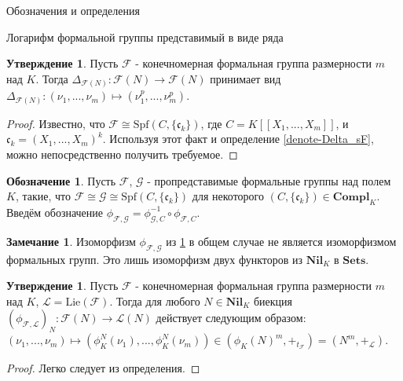 \documentclass[a4paper,14pt]{extarticle}
\theoremstyle{definition}
\newtheorem{denotation}[definition]{Обозначение}
\newtheorem{claim}[theorem]{Утверждение}
\newtheorem{remark}{Замечание}[section]
\newcommand{\Sets}{\mathbf{Sets}}
\newcommand{\Compl}[1]{\mathbf{Compl}_{#1}}
\newcommand{\forget}[1]{\phi_{#1}}
\newcommand{\Lie}[1]{\mathrm{Lie}\left(#1\right)}
\newcommand{\Nil}[1]{\mathbf{Nil}_{#1}}
\newcommand{\Spf}[1]{\mathrm{Spf}\left(#1\right)}
\newcommand{\fc}{\mathfrak{c}}
\newcommand{\sF}{\mathscr{F}}
\newcommand{\sG}{\mathscr{G}}
\newcommand{\sL}{\mathscr{L}}
\begin{document}
\begin{section}{Обозначения и определения}
\begin{subsection}{Логарифм формальной группы представимый в виде ряда}
\begin{claim}\label{claim-Delta_sF_for_finite_sF}
    Пусть $\sF$ - конечномерная формальная группа размерности $m$ над $K$. Тогда ${ \Delta_{\sF(N)} : \sF(N) \rightarrow \sF(N) }$ принимает вид ${ \Delta_{\sF(N)} : (\nu_1, ..., \nu_m) \mapsto (\nu_1^p, ..., \nu_m^p) }$.
\end{claim}
\begin{proof}
    Известно, что ${ \sF \cong \Spf{C, \{\fc_k\}} }$, где ${ C = K[[X_1, ..., X_m]] }$, и ${ \fc_k = (X_1, ..., X_m)^k }$. Используя этот факт и определение \ref{denote-Delta_sF}, можно непосредственно получить требуемое.
\end{proof}

\begin{denotation}\label{claim-forget_sF-sL}
    Пусть $\sF$, $\sG$ - пропредставимые формальные группы над полем $K$, такие, что ${ \sF \cong \sG \cong \Spf{C, \{\fc_k\}} }$ для некоторого ${ (C, \{ \fc_k \}) \in \Compl{K} }$. Введём обозначение ${ \forget{\sF, \sG} = \forget{\sG, C}^{-1} \circ \forget{\sF, C} }$.
\end{denotation}

\begin{remark}
    Изоморфизм $\forget{\sF, \sG}$ из \ref{claim-forget_sF-sL} в общем случае не является изоморфизмом формальных групп. Это лишь изоморфизм двух функторов из $\Nil{K}$ в $\Sets$.
\end{remark}

\begin{claim}\label{claim-forget_sF-sL_for_finite_sF}
    Пусть $\sF$ - конечномерная формальная группа размерности $m$ над $K$, ${ \sL = \Lie{\sF} }$. Тогда для любого ${ N \in \Nil{K} }$ биекция ${ \left(\forget{\sF, \sL}\right)_N : \sF(N) \rightarrow \sL(N) }$ действует следующим образом: ${ (\nu_1, ..., \nu_m) \mapsto \left(\forget{K}^N(\nu_1), ..., \forget{K}^N(\nu_m)\right) \in \left( \forget{K}(N)^m, +_{t_\sF} \right) = (N^m, +_\sL) }$.
\end{claim}
\begin{proof}
    Легко следует из определения.
\end{proof}


\end{subsection}
\end{section}
\end{document}

